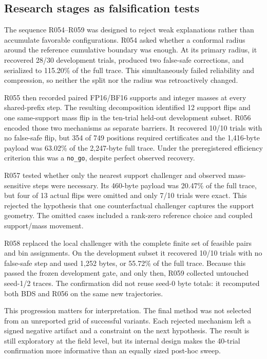 \documentclass[sigconf,review,nonacm]{acmart}
\begin{document}
\subsection{Research stages as falsification tests}
The sequence R054--R059 was designed to reject weak explanations rather than accumulate favorable configurations. R054 asked whether a conformal radius around the reference cumulative boundary was enough. At its primary radius, it recovered 28/30 development trials, produced two false-safe corrections, and serialized to 115.20\% of the full trace. This simultaneously failed reliability and compression, so neither the split nor the radius was retroactively changed.

R055 then recorded paired FP16/BF16 supports and integer masses at every shared-prefix step. The resulting decomposition identified 12 support flips and one same-support mass flip in the ten-trial held-out development subset. R056 encoded those two mechanisms as separate barriers. It recovered 10/10 trials with no false-safe flip, but 354 of 749 positions required certificates and the 1,416-byte payload was 63.02\% of the 2,247-byte full trace. Under the preregistered efficiency criterion this was a \texttt{no\_go}, despite perfect observed recovery.

R057 tested whether only the nearest support challenger and observed mass-sensitive steps were necessary. Its 460-byte payload was 20.47\% of the full trace, but four of 13 actual flips were omitted and only 7/10 trials were exact. This rejected the hypothesis that one counterfactual challenger captures the support geometry. The omitted cases included a rank-zero reference choice and coupled support/mass movement.

R058 replaced the local challenger with the complete finite set of feasible pairs and bin assignments. On the development subset it recovered 10/10 trials with no false-safe step and used 1,252 bytes, or 55.72\% of the full trace. Because this passed the frozen development gate, and only then, R059 collected untouched seed-1/2 traces. The confirmation did not reuse seed-0 byte totals: it recomputed both BDS and R056 on the same new trajectories.

This progression matters for interpretation. The final method was not selected from an unreported grid of successful variants. Each rejected mechanism left a signed negative artifact and a constraint on the next hypothesis. The result is still exploratory at the field level, but its internal design makes the 40-trial confirmation more informative than an equally sized post-hoc sweep.
\end{document}
